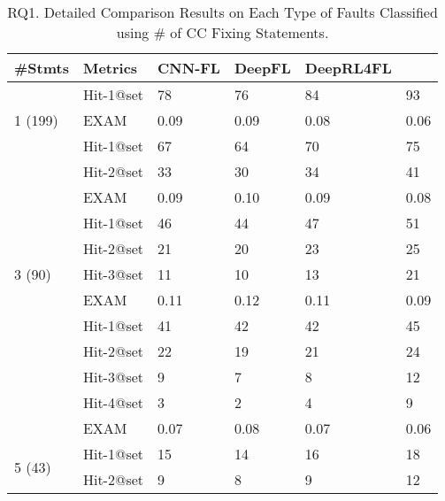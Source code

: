 \begin{table}[t]
	\caption{RQ1. Detailed Comparison Results on Each Type of Faults Classified using \# of CC Fixing Statements.}
        \vspace{-6pt}
	{\small
		\begin{center}
			\renewcommand{\arraystretch}{1}
			\begin{tabular}{p{1cm}<{\centering}|p{1.33cm}<{\centering}|p{1cm}<{\centering}|p{0.7cm}<{\centering}|p{1.2cm}<{\centering}|p{1.2cm}<{\centering}}
				\hline
				\#Stmts & Metrics & CNN-FL & DeepFL & DeepRL4FL & \tool \\
				\hline
				\multirow{3}{*}{1 (199)}   & Hit-1@set     & 78 & 76 & 84 & 93 \\
							    		 & EXAM          & 0.09 & 0.09 & 0.08 & 0.06 \\
				\hline
				\multirow{4}{*}{2 (142)}  & Hit-1@set     & 67 & 64 & 70 & 75 \\
										& Hit-2@set     & 33 & 30 & 34 & 41 \\
									   	& EXAM          & 0.09 & 0.10 & 0.09 & 0.08 \\
				\hline
				\multirow{5}{*}{3 (90)}  & Hit-1@set     & 46 & 44 & 47 & 51 \\
										& Hit-2@set     & 21 & 20 & 23 & 25\\
										& Hit-3@set     & 11 &10 & 13 & 21 \\
										& EXAM          & 0.11 & 0.12 & 0.11 & 0.09 \\
				\hline
				\multirow{6}{*}{4 (78)}  & Hit-1@set     & 41 & 42 & 42 & 45 \\
										& Hit-2@set     &22 & 19 & 21 & 24 \\
										& Hit-3@set     & 9 & 7 & 8 & 12 \\
										& Hit-4@set     & 3 & 2 & 4 & 9 \\
										& EXAM          & 0.07 & 0.08 & 0.07 & 0.06 \\
				\hline
				\multirow{7}{*}{5 (43)}  & Hit-1@set     & 15 & 14 & 16 & 18 \\
										& Hit-2@set     & 9 & 8 & 9 & 12 \\

\end{tabular}
\end{center}}
\end{table}

